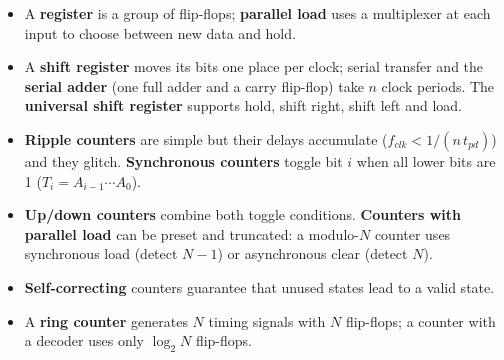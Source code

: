 \begin{chaptersummary}
\begin{itemize}
  \item A \textbf{register} is a group of flip-flops; \textbf{parallel load} uses a multiplexer at each input to choose between new data and hold.
  \item A \textbf{shift register} moves its bits one place per clock; serial transfer and the \textbf{serial adder} (one full adder and a carry flip-flop) take $n$ clock periods. The \textbf{universal shift register} supports hold, shift right, shift left and load.
  \item \textbf{Ripple counters} are simple but their delays accumulate ($f_{clk}<1/(n\,t_{pd})$) and they glitch. \textbf{Synchronous counters} toggle bit $i$ when all lower bits are 1 ($T_i=A_{i-1}\cdots A_0$).
  \item \textbf{Up/down counters} combine both toggle conditions. \textbf{Counters with parallel load} can be preset and truncated: a modulo-$N$ counter uses synchronous load (detect $N-1$) or asynchronous clear (detect $N$).
  \item \textbf{Self-correcting} counters guarantee that unused states lead to a valid state.
  \item A \textbf{ring counter} generates $N$ timing signals with $N$ flip-flops; a counter with a decoder uses only $\log_2N$ flip-flops.
\end{itemize}
\end{chaptersummary}

